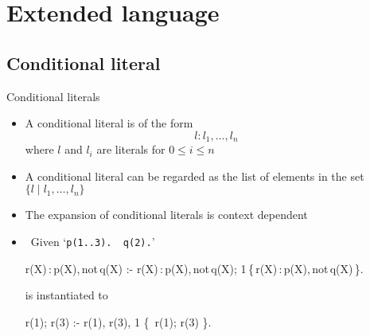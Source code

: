 \section{Extended language}
\subsection{Conditional literal}
\begin{frame}[fragile]{Conditional literals}
  \begin{itemize}
  \item {} A \alert{conditional literal} is of the form
    \[
     l:l_1,\dots, l_n
    \]
    where $l$ and $l_i$ are literals for $0\leq i\leq n$
  \item {}
    A conditional literal can be regarded as the list of elements in the
    set $\{ l\mid l_1,\dots, l_n\}$
  \item<2->  The expansion of conditional literals is context dependent
  \item<3->  \
  Given `\;\verb+p(1..3).  q(2).+'

  \smallskip%
  \parbox{\linewidth}{\footnotesize%
  \begin{semiverbatim}
  \alert<4,5>{r(X)\,:\,p(X)\!,\,not\,q(X)} :- \alert<4,6>{r(X)\,:\,p(X)\!,\,not\,q(X)}; 1\,\{\,\alert<4,7>{r(X)\,:\,p(X)\!,\,not\,q(X)}\,\}.
  \end{semiverbatim}}

  \smallskip
  is instantiated to

  \medskip%
  \parbox{\linewidth}{\footnotesize%
  \begin{semiverbatim}
  \alert<5>{r(1); r(3)} :- \alert<6>{r(1), r(3)}, 1 \{~\alert<7>{r(1); r(3)} \}.
  \end{semiverbatim}}
  \end{itemize}
\end{frame}
